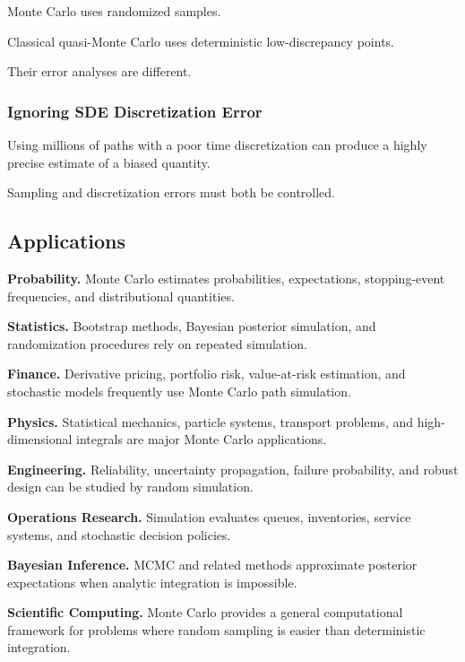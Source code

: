 Monte Carlo uses randomized samples.

Classical quasi-Monte Carlo uses deterministic low-discrepancy points.

Their error analyses are different.

\subsubsection{Ignoring SDE Discretization Error}

Using millions of paths with a poor time discretization can produce a
highly precise estimate of a biased quantity.

Sampling and discretization errors must both be controlled.

\subsection{Applications}
\label{subsec:monte-carlo-applications}

\begin{applicationbox}

\textbf{Probability.}
Monte Carlo estimates probabilities, expectations, stopping-event
frequencies, and distributional quantities.

\medskip

\textbf{Statistics.}
Bootstrap methods, Bayesian posterior simulation, and randomization
procedures rely on repeated simulation.

\medskip

\textbf{Finance.}
Derivative pricing, portfolio risk, value-at-risk estimation, and
stochastic models frequently use Monte Carlo path simulation.

\medskip

\textbf{Physics.}
Statistical mechanics, particle systems, transport problems, and high-
dimensional integrals are major Monte Carlo applications.

\medskip

\textbf{Engineering.}
Reliability, uncertainty propagation, failure probability, and robust
design can be studied by random simulation.

\medskip

\textbf{Operations Research.}
Simulation evaluates queues, inventories, service systems, and stochastic
decision policies.

\medskip

\textbf{Bayesian Inference.}
MCMC and related methods approximate posterior expectations when analytic
integration is impossible.

\medskip

\textbf{Scientific Computing.}
Monte Carlo provides a general computational framework for problems where
random sampling is easier than deterministic integration.

\end{applicationbox}

